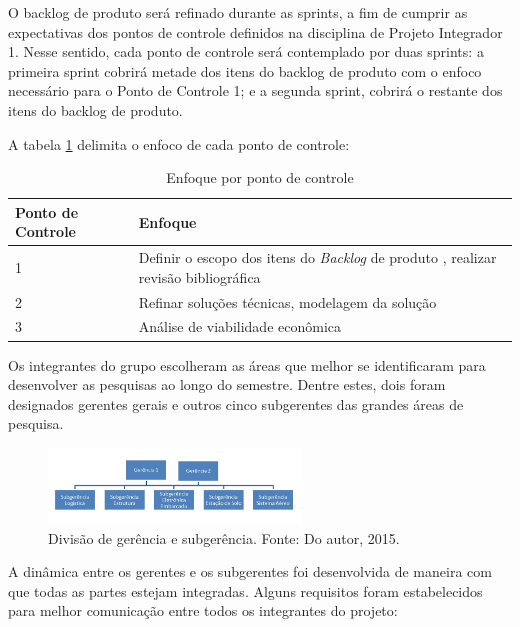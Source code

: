   O backlog de produto será refinado durante as sprints, a fim de cumprir as expectativas dos pontos de controle definidos na disciplina de Projeto Integrador 1. Nesse sentido, cada ponto de controle será contemplado por duas sprints: a primeira sprint cobrirá metade dos itens do backlog de produto com o enfoco necessário para o Ponto de Controle 1; e a segunda sprint, cobrirá o restante dos itens do backlog de produto.

  A tabela \ref{tab:enfoque_pc} delimita o enfoco de cada ponto de controle:

  \begin{table}[H]
  \centering
  \begin{tabular}{|p{4cm}|p{12cm}|}
  \hline
  Ponto de Controle & Enfoque                                                                                      \\ \hline
  1                 & Definir o escopo dos itens do \textit{Backlog} de produto , realizar revisão bibliográfica \\ \hline
  2                 & Refinar soluções técnicas, modelagem da solução                                              \\ \hline
  3                 & Análise de viabilidade econômica                                                             \\ \hline
  \end{tabular}
  \caption{Enfoque por ponto de controle}
  \label{tab:enfoque_pc}
  \end{table}

  Os integrantes do grupo escolheram as áreas que melhor se identificaram para desenvolver as pesquisas ao longo do semestre. Dentre estes, dois foram designados gerentes gerais e outros cinco subgerentes das grandes áreas de pesquisa.

  \begin{figure}[H]
  	\centering
  	\includegraphics[width=0.6\textwidth]{figuras/eap}
  	\caption{Divisão de gerência e subgerência. Fonte: Do autor, 2015.}
  	\label{img:eap}
  \end{figure}

  A dinâmica entre os gerentes e os subgerentes foi desenvolvida de maneira com que todas as partes estejam integradas. Alguns requisitos foram estabelecidos para melhor comunicação entre todos os integrantes do projeto:

